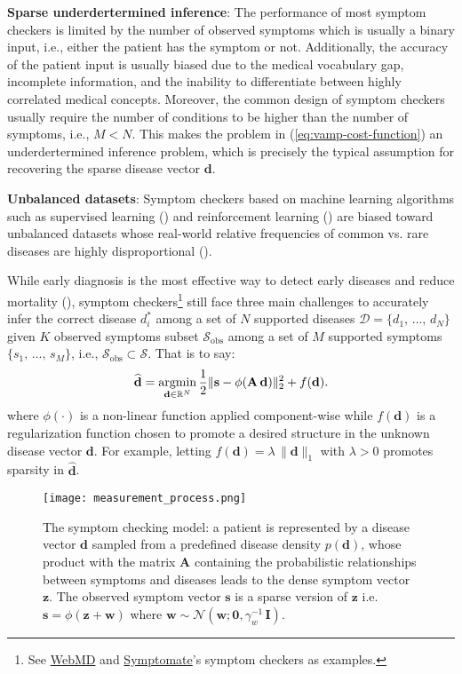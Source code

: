 \documentclass[pmlr,twocolumn,10pt]{jmlr} %
\DeclareMathOperator*{\argminA}{argmin}
\begin{document}
\noindent\textbf{Sparse underdertermined inference}: The performance of most symptom checkers is limited by the number of observed symptoms which is usually a binary input, i.e., either the patient has the symptom or not. Additionally, the accuracy of the patient input is usually biased due to the medical vocabulary gap, incomplete information, and the inability to differentiate between highly correlated medical concepts. Moreover, the common design of symptom checkers usually require the number of conditions to be higher than the number of symptoms, i.e., $M < N$. This makes the problem in (\ref{eq:vamp-cost-function}) an underdertermined inference problem, which is precisely the typical assumption for recovering the sparse disease vector $\bm{d}$.

\noindent\textbf{Unbalanced datasets}: Symptom checkers based on machine learning algorithms such as supervised learning (\cite{pmlr-v56-Choi16}) and reinforcement learning (\cite{akrout2019improving}) are biased toward unbalanced datasets whose real-world relative frequencies of common vs. rare diseases are highly disproportional (\cite{fraser2017limitations}).

While early diagnosis is the most effective way to detect early diseases and reduce mortality (\cite{coleman2017early}), symptom checkers\footnote{See \href{https://symptoms.webmd.com/}{WebMD} and \href{https://symptomate.com/}{Symptomate}'s symptom checkers as examples.} still face three main challenges to accurately infer the correct disease $d_i^*$ among a set of $N$ supported diseases $\mathcal{D} = \{d_1,\, \dots,\, d_N\}$ given $K$ observed symptoms subset $\mathcal{S}_{\textrm{obs}}$ among a set of $M$ supported symptoms $\{s_1,\,\dots,\, s_M\}$, i.e., $\mathcal{S}_{\textrm{obs}} \subset \mathcal{S}$. That is to say:
\begin{equation}\label{eq:vamp-cost-function}
\small
     \widehat{\mathbf{d}}=\argminA_{\mathbf{d} \in \mathbb{R}^{N}} \frac{1}{2}\|\mathbf{s}-\phi(\mathbf{A}\, \mathbf{d})\|_{2}^{2}+f(\mathbf{d}).
\end{equation}
where $\phi(\cdot)$ is a non-linear function applied component-wise while $f(\mathbf{d})$ is a regularization function chosen to promote a desired structure in the unknown disease vector $\mathbf{d}$. For example, letting $f(\mathbf{d}) = \lambda\,\|\mathbf{d}\|_1$ with $\lambda > 0$ promotes sparsity in $\widehat{\mathbf{d}}$.
\begin{figure}[h]
\centering
\texttt{[image: measurement\_process.png]}
\caption{The symptom checking model: a patient is represented by a disease vector $\mathbf{d}$ sampled from a predefined disease density $p(\mathbf{d})$, whose product with the matrix $\bm{A}$ containing the probabilistic relationships between symptoms and diseases leads to the dense symptom vector $\mathbf{z}$. The observed symptom vector $\mathbf{s}$ is a sparse version of $\mathbf{z}$ i.e. $\mathbf{s} = \phi(\mathbf{z + \mathbf{w}})$ where $\mathbf{w} \sim \mathcal{N}(\mathbf{w}; \bm{0}, \gamma_w^{-1}\,\mathbf{I})$.}
\label{fig:disease-diagnosis-process}
\vspace{-0.35cm}
\end{figure}
\end{document}
